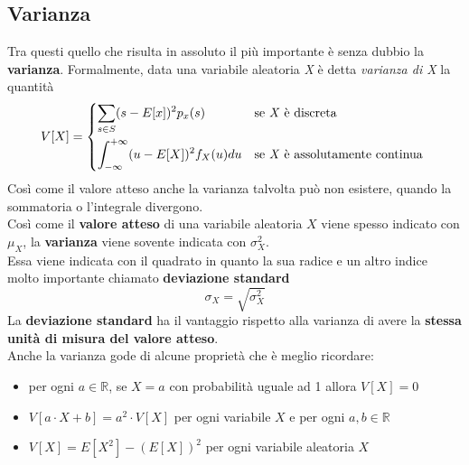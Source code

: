 \subsection{Varianza}
Tra questi quello che risulta in assoluto il più importante è senza dubbio la \textbf{varianza}.
Formalmente, data una variabile aleatoria \textit{X} è detta \textit{varianza di X} la quantità
\begin{equation}
V[X] = 
\begin{dcases*}
\sum_{s \in S}  (s - E[x])^2 p_x(s) & \text{se \textit{X} è discreta}  \\
\int_{-\infty}^{+\infty} (u - E[X])^2  f_X(u)du & \text{se \textit{X} è assolutamente continua}
\end{dcases*}
\end{equation}
Così come il valore atteso anche la varianza talvolta può non esistere, quando la sommatoria o l’integrale divergono.\\
Così come il \textbf{valore atteso} di una variabile aleatoria $X$ viene spesso indicato con $\mu_X$, la \textbf{varianza} viene sovente indicata con $\sigma_X^2$.\\
Essa viene indicata con il quadrato in quanto la sua radice e un altro indice molto importante chiamato \textbf{deviazione standard}
\[
\sigma_X = \sqrt{\sigma_X^2}
\]
La \textbf{deviazione standard} ha il vantaggio rispetto alla varianza di avere la \textbf{stessa unità di misura del valore atteso}.\\
Anche la varianza gode di alcune proprietà che è meglio ricordare:
\begin{itemize}
	\item per ogni $a \in \mathbb{R}$, se $X = a$ con probabilità uguale ad 1 allora $V[X] = 0$
	\item $V[a \cdot X + b] = a^2 \cdot V[X]$ per ogni variabile $X$ e per ogni $a, b \in \mathbb{R}$
	\item $V[X] = E[X^2] - (E[X])^2$ per ogni variabile aleatoria $X$
\end{itemize}

